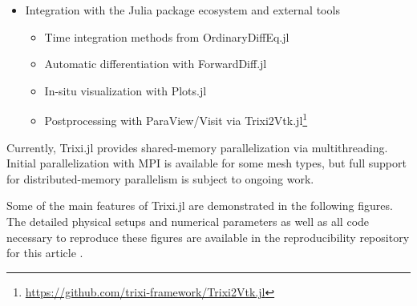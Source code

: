 \documentclass[hidelinks]{juliacon} %
\newcommand{\trixi}{Trixi.jl\xspace}
\begin{document}
\begin{itemize}
  \item Integration with the Julia package ecosystem and external tools
  \begin{itemize}
    \item Time integration methods from OrdinaryDiffEq.jl
    \item Automatic differentiation with ForwardDiff.jl
    \item In-situ visualization with Plots.jl
    \item Postprocessing with ParaView/Visit via Trixi2Vtk.jl\footnote{\url{https://github.com/trixi-framework/Trixi2Vtk.jl}}
  \end{itemize}
\end{itemize}

Currently, \trixi provides shared-memory parallelization via multithreading.
Initial parallelization with MPI is available for some mesh types,
but full support for distributed-memory parallelism is subject to ongoing work.

Some of the main features of \trixi are demonstrated in the following figures.
The detailed physical setups and numerical parameters as well as all code
necessary to reproduce these figures are available in the reproducibility
repository for this article \cite{ranocha2021adaptiveRepro}.
\end{document}
